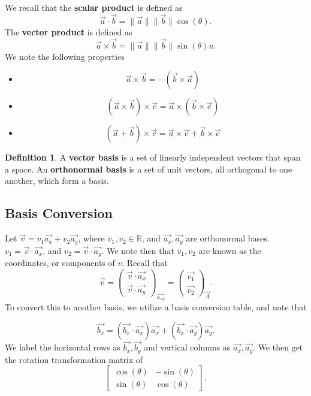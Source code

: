 \documentclass[11pt]{article}
\theoremstyle{plain} %
\theoremstyle{definition}
\newtheorem*{definition}{Definition} %
\theoremstyle{example}
\theoremstyle{remark}
\begin{document}
We recall that the \textbf{scalar product} is defined as
$$\vec{a} \cdot \vec{b} = \|\vec{a}\|\|\vec{b}\|\cos(\theta).$$
The \textbf{vector product} is defined as
$$\vec{a}\times\vec{b} = \|\vec{a}\|\|\vec{b}\|\sin(\theta)u.$$
We note the following properties
\begin{itemize}
	\item  $$\vec{a} \times \vec{b} = -\left(\vec{b} \times \vec{a}\right)$$
	\item $$\left(\vec{a} \times \vec{b}\right)\times \vec{c} = \vec{a} \times \left(\vec{b}\times \vec{c}\right) $$
	\item $$\left(\vec{a}+ \vec{b}\right)\times \vec{c} = \vec{a}\times\vec{c} + \vec{b}\times\vec{c}$$
\end{itemize}

\begin{definition}
A \textbf{vector basis} is a set of linearly independent vectors that span a space. An \textbf{orthonormal basis} is a set of unit vectors, all orthogonal to one another, which form a basis.
\end{definition}

\subsection{Basis Conversion}
Let $\vec{v} = v_1\vec{a_x} + v_2\vec{a_y}$, where $v_1, v_2 \in \mathbb R$, and $\vec{a_x}, \vec{a_y}$ are orthonormal bases. $v_1 = \vec{v}\cdot\vec{a_x}$, and $v_2 = \vec{v}\cdot \vec{a_y}$. We note then that $v_1, v_2$ are known as the coordinates, or components of $v$. Recall that $$\vec{v} = \begin{pmatrix}\vec{v}\cdot\vec{a_x}\\
\vec{v}\cdot\vec{a_y}\end{pmatrix}_{\vec{a_{xy}}} =  \begin{pmatrix}\vec{v_1}\\
\vec{v_2}\end{pmatrix}_{\vec{A}}.$$
To convert this to another basis, we utilize a basis conversion table, and note that

$$\vec{b_x} = \left(\vec{b_x}\cdot\vec{a_x}\right)\vec{a_x} + \left(\vec{b_x}\cdot\vec{a_y}\right)\vec{a_y}.$$
We label the horizontal rows as $\vec{b_x}, \vec{b_y}$ and vertical columns as $\vec{a_x}, \vec{a_y}$. We then get the rotation transformation matrix of 
$$\begin{bmatrix}\cos(\theta)& -\sin(\theta)\\ \sin(\theta) & \cos(\theta)\end{bmatrix}.$$ 
\end{document}
